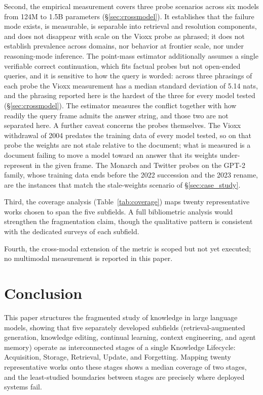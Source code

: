 \documentclass[10pt]{article}
\begin{document}
Second, the empirical measurement covers three probe scenarios across six models from 124M to 1.5B parameters (\S\ref{sec:crossmodel}). It establishes that the failure mode exists, is measurable, is separable into retrieval and resolution components, and does not disappear with scale on the Vioxx probe as phrased; it does not establish prevalence across domains, nor behavior at frontier scale, nor under reasoning-mode inference. The point-mass estimator additionally assumes a single verifiable correct continuation, which fits factual probes but not open-ended queries, and it is sensitive to how the query is worded: across three phrasings of each probe the Vioxx measurement has a median standard deviation of 5.14 nats, and the phrasing reported here is the hardest of the three for every model tested (\S\ref{sec:crossmodel}). The estimator measures the conflict together with how readily the query frame admits the answer string, and those two are not separated here. A further caveat concerns the probes themselves. The Vioxx withdrawal of 2004 predates the training data of every model tested, so on that probe the weights are not stale relative to the document; what is measured is a document failing to move a model toward an answer that its weights under-represent in the given frame. The Monarch and Twitter probes on the GPT-2 family, whose training data ends before the 2022 succession and the 2023 rename, are the instances that match the stale-weights scenario of \S\ref{sec:case_study}.

Third, the coverage analysis (Table~\ref{tab:coverage}) maps twenty representative works chosen to span the five subfields. A full bibliometric analysis would strengthen the fragmentation claim, though the qualitative pattern is consistent with the dedicated surveys of each subfield.

Fourth, the cross-modal extension of the metric is scoped but not yet executed; no multimodal measurement is reported in this paper.

\section{Conclusion}
\label{sec:conclusion}

This paper structures the fragmented study of knowledge in large language models, showing that five separately developed subfields (retrieval-augmented generation, knowledge editing, continual learning, context engineering, and agent memory) operate as interconnected stages of a single Knowledge Lifecycle: Acquisition, Storage, Retrieval, Update, and Forgetting. Mapping twenty representative works onto these stages shows a median coverage of two stages, and the least-studied boundaries between stages are precisely where deployed systems fail.
\end{document}
